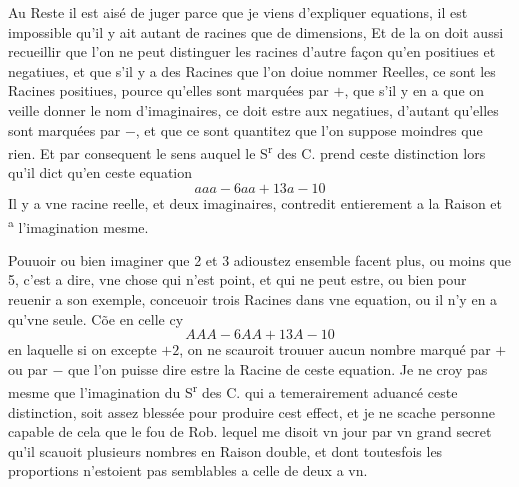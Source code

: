 \documentclass[11pt,a4paper]{article}
\begin{document}
Au Reste il est aisé de juger parce que je viens d'expliquer  equations, il est impossible qu'il y ait autant de racines que de dimensions, Et de la on doit aussi recueillir que l'on ne peut distinguer les racines d'autre façon qu'en positiues et negatiues, et que s'il y a des Racines que l'on doiue nommer Reelles, ce sont les Racines positiues, pource qu'elles sont  marquées par $+$, que s'il y en a que on veille donner le nom d'imaginaires, ce doit estre aux negatiues, d'autant qu'elles sont marquées par $-$, et que ce sont quantitez que l'on suppose moindres que rien. Et par consequent le sens auquel le S\textsuperscript{r} des C. prend ceste distinction lors qu'il dict qu'en ceste equation
\[ aaa - 6aa + 13a - 10 \]
Il y a vne racine reelle, et deux imaginaires, contredit entierement a la Raison et \textsuperscript{a} l'imagination mesme.


Pouuoir ou bien imaginer que 2 et 3 adioustez ensemble facent plus, ou moins que 5, c'est a dire, vne chose qui n'est point, et qui ne peut estre, ou bien pour reuenir a son exemple, conceuoir trois Racines dans vne equation, ou il n'y en a qu'vne seule. Cõe en celle cy
\[ AAA - 6AA + 13A - 10 \]
en laquelle si on excepte $+2$, on ne scauroit trouuer aucun  nombre marqué par $+$ ou par $-$ que l'on puisse dire estre la Racine de ceste equation. Je ne croy pas mesme que l'imagination  du S\textsuperscript{r} des C. qui a temerairement aduancé ceste distinction, soit assez blessée pour produire cest effect, et je ne scache personne capable de cela que le fou de Rob. lequel me disoit vn jour par vn grand secret qu'il scauoit plusieurs nombres en Raison double, et dont toutesfois les proportions n'estoient pas semblables a celle de deux a vn.
\end{document}
